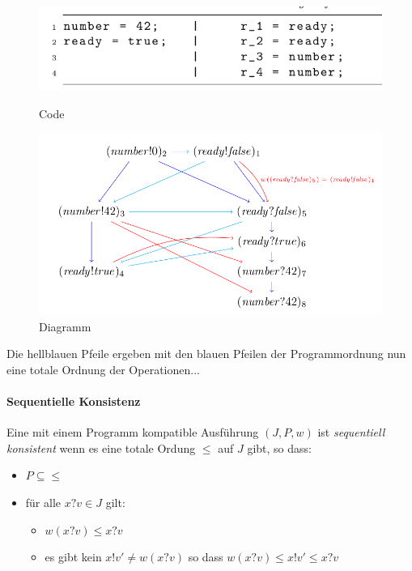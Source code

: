 \documentclass[a4paper,10pt, oneside]{book}
\begin{document}
\begin{figure}[htb]
	
	\begin{minipage}[t]{0.3\linewidth}
		\centering
		\includegraphics[scale=0.3]{KompCode}
		\caption{Code}
	\end{minipage}
	\hfill
	\begin{minipage}[t]{0.6\linewidth}
		\centering
		\includegraphics[scale=0.3]{seqDia}
		\caption{Diagramm}
	\end{minipage}
\end{figure}

Die hellblauen Pfeile ergeben mit den blauen Pfeilen der Programmordnung nun eine totale Ordnung der Operationen...

\paragraph{Sequentielle Konsistenz}
Eine mit einem Programm kompatible Ausführung $(J,P,w)$ ist \textit{sequentiell konsistent} wenn es eine totale Ordung $\leq$ auf $J$ gibt, so dass:
\begin{itemize}
 \item $P \subseteq \leq$
 \item für alle $x?v \in J$ gilt:
 \begin{itemize}
  \item $w(x?v) \leq x?v$
  \item es gibt kein $x!v' \not= w(x?v)$ so dass $w(x?v) \leq x!v' \leq x?v$
 \end{itemize}
\end{itemize}
\end{document}
